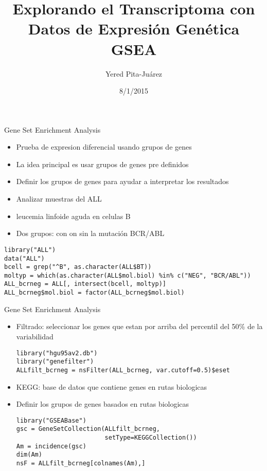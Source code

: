 \documentclass{beamer}
\begin{document}
\title[GSEA]{Explorando el Transcriptoma con Datos de Expresi\'{o}n Gen\'{e}tica\\
\vspace{0.5cm}
GSEA}
\author{Yered Pita-Ju\'{a}rez}
\date{8/1/2015}


\begin{frame}
\titlepage
\end{frame}

\begin{frame}[fragile]{Gene Set Enrichment Analysis}
\begin{itemize}
\item Prueba de expresion diferencial usando grupos de genes
\item La idea principal es usar grupos de genes pre definidos
\item Definir los grupos de genes para ayudar a interpretar los resultados
\item Analizar muestras del ALL
\item leucemia linfoide aguda en celulas B
\item Dos grupos: con on sin la mutación BCR/ABL
\end{itemize}
\footnotesize
\begin{verbatim}
library("ALL")
data("ALL")
bcell = grep("^B", as.character(ALL$BT))
moltyp = which(as.character(ALL$mol.biol) %in% c("NEG", "BCR/ABL"))
ALL_bcrneg = ALL[, intersect(bcell, moltyp)]
ALL_bcrneg$mol.biol = factor(ALL_bcrneg$mol.biol)
\end{verbatim}
\end{frame}



\begin{frame}[fragile]{Gene Set Enrichment Analysis}
\begin{itemize}
\item Filtrado: seleccionar los genes que estan por arriba del percentil del 50\% de la variabilidad
\begin{verbatim}
library("hgu95av2.db")
library("genefilter")
ALLfilt_bcrneg = nsFilter(ALL_bcrneg, var.cutoff=0.5)$eset
\end{verbatim}
\item KEGG: base de datos que contiene genes en rutas biologicas
\item Definir los grupos de genes basados en rutas biologicas
\begin{verbatim}
library("GSEABase")
gsc = GeneSetCollection(ALLfilt_bcrneg,
                        setType=KEGGCollection())
Am = incidence(gsc)
dim(Am)
nsF = ALLfilt_bcrneg[colnames(Am),]
\end{verbatim}
\end{itemize}
\end{frame}
\end{document}
